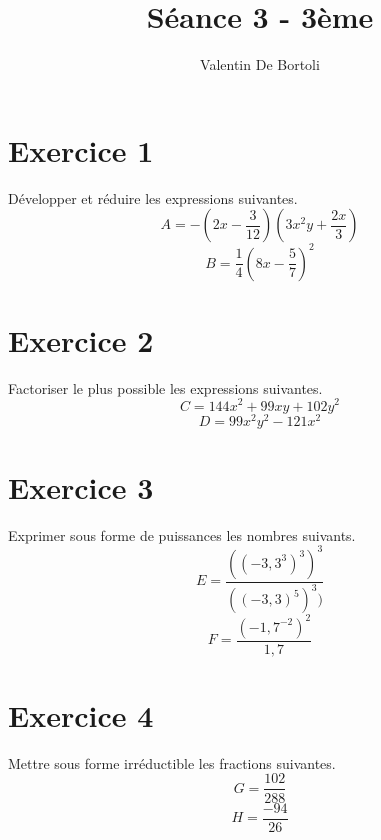 \documentclass[10pt,a4paper]{article}
\title{Séance 3 - 3ème}
\author{Valentin De Bortoli}
\begin{document}
\maketitle
\section{Exercice 1}
Développer et réduire les expressions suivantes.
\begin{equation}
A=-(2x-\frac{3}{12})(3x^2y+\frac{2x}{3})
\end{equation}
\begin{equation}
B=\frac{1}{4}(8x-\frac{5}{7})^2
\end{equation}
\section{Exercice 2}
Factoriser le plus possible les expressions suivantes.
\begin{equation}
C=144x^2+99xy+102y^2
\end{equation}
\begin{equation}
D=99x^2y^2-121x^2
\end{equation}
\section{Exercice 3}
Exprimer sous forme de puissances les nombres suivants.
\begin{equation}
E=\frac{((-3,3^3)^3)^3}{((-3,3)^5)^3)}
\end{equation}
\begin{equation}
F=\frac{(-1,7^{-2})^2}{1,7}
\end{equation}
\section{Exercice 4}
Mettre sous forme irréductible les fractions suivantes.
\begin{equation}
G=\frac{102}{288}
\end{equation}
\begin{equation}
H=\frac{-94}{26}
\end{equation}
\end{document}
